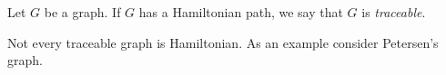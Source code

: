 \documentclass{article}
\begin{document}
Let $G$ be a graph. If $G$ has a Hamiltonian path, we say that $G$ is \emph{traceable}.

Not every traceable graph is Hamiltonian. As an example consider Petersen's graph.
\end{document}
